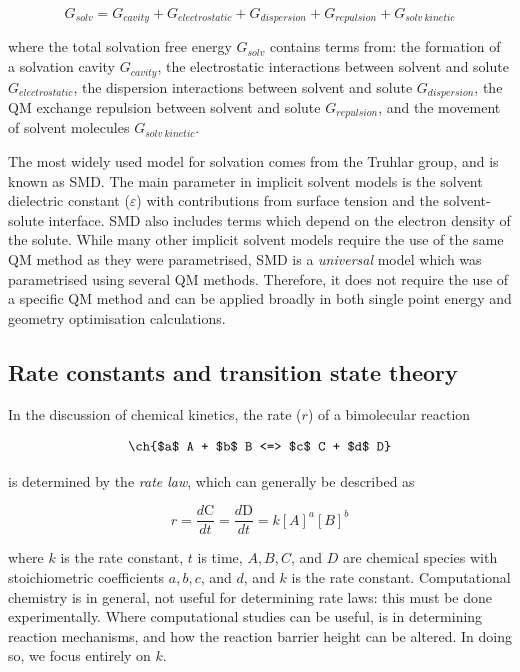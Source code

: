 \begin{equation}
G_{solv} = G_{cavity} + G_{electrostatic} + G_{dispersion} + G_{repulsion} +
G_{solv~kinetic}
\end{equation}

\noindent where the total solvation free energy $G_{solv}$ contains terms from: the formation of a solvation cavity $G_{cavity}$, the electrostatic interactions between solvent and solute $G_{electrostatic}$, the dispersion interactions between solvent and solute $G_{dispersion}$, the QM exchange repulsion between solvent and solute $G_{repulsion}$, and the movement of solvent molecules $G_{solv~kinetic}$.

The most widely used model for solvation comes from the Truhlar group, and is known as SMD.\cite{Marenich2009} The main parameter in implicit solvent models is the solvent dielectric constant ($\varepsilon$) with contributions from surface tension and the solvent-solute interface. SMD also includes terms which depend on the electron density of the solute.  While many other implicit solvent models require the use of the same QM method as they were parametrised,\cite{Ho2010} SMD is a \emph{universal} model which was parametrised using several QM methods. Therefore, it does not require the use of a specific QM method and can be applied broadly in both single point energy and geometry optimisation calculations.

\subsection{Rate constants and transition state theory}

In the discussion of chemical kinetics, the rate ($r$) of a bimolecular reaction

\begin{equation}
  \ch{$a$ A + $b$ B <=> $c$ C + $d$ D}
  \label{eq:a}
\end{equation}

\noindent is determined by the \emph{rate law}, which can generally be described as

\begin{equation}
  r = \frac{d \text{C}}{dt} =\frac{d \text{D}}{dt} = k[A]^a[B]^b
\end{equation}

\noindent where $k$ is the rate constant, $t$ is time, $A, B, C$, and $D$ are chemical species with stoichiometric coefficients $a, b, c$, and $d$, and $k$ is the rate constant. Computational chemistry is in general, not useful for determining rate laws: this must be done experimentally. Where computational studies can be useful, is in determining reaction mechanisms, and how the reaction barrier height can be altered. In doing so, we focus entirely on $k$.

